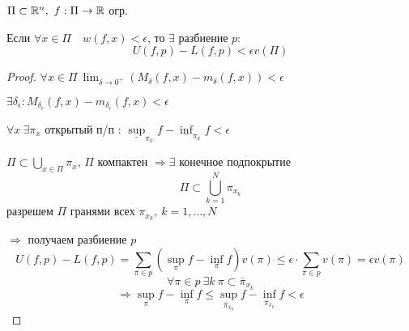     \begin{lemma}
        $\Pi \subset \mathbb{R}^n, \ f : \Pi \rightarrow \mathbb{R}$ огр.
        \par Если $\forall x \in \Pi \quad w(f, x) < \epsilon$, то  $\exists$ разбиение $p$:
        \[
            U(f, p) - L(f, p) < \epsilon v(\Pi)    
        \]
    \end{lemma}
    \begin{proof}
        $\forall x \in \Pi \ \lim_{\delta \rightarrow 0^+}(M_\delta(f, x) - m_\delta(f, x)) < \epsilon$
        \par $\exists \delta_\epsilon : M_{\delta_\epsilon}(f, x) - m_{\delta_\epsilon}(f, x) < \epsilon$
        \par $\forall x \ \exists \pi_x$ открытый п/п : $\underline{\sup}_{\pi_x} f - \underline{\inf}_{\pi_x} f < \epsilon$
        \par $\Pi \subset \bigcup_{x \in \Pi} \pi_x$, $\Pi$ компактен $\Rightarrow \exists$ конечное подпокрытие
        \[
            \Pi \subset \bigcup_{k=1}^N \pi_{x_k}    
        \]
        разрешем $\Pi$ гранями всех $\pi_{x_k}, \ k = 1, \dots, N$
        \par $\Rightarrow$ получаем разбиение $p$
        \[
            U(f, p) - L(f, p) = \sum_{\pi \in p} (\sup_\pi f - \inf_\pi f) v(\pi) \le \epsilon \cdot \sum_{\pi \in p} v(\pi) = \epsilon v(\pi)    
        \]
        \[
            \forall \pi \in p \ \exists k \ \pi \subset \bar \pi_{x_k}    
        \]
        \[
            \Rightarrow \sup_\pi f - \inf_\pi f \le \sup_{\bar \pi_{x_k}} f - \inf_{\bar \pi_{x_k}} f < \epsilon
        \]
    \end{proof}

